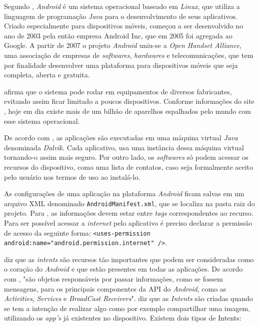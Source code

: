 
	\par Segundo , \textit{Android} é um sistema
operacional baseado em \textit{Linux}, que utiliza a
linguagem de programação \textit{Java} para o desenvolvimento de seus
aplicativos. Criado especialmente para dispositivos móveis, começou a
ser desenvolvido no ano de 2003 pela então empresa Android Inc, que em 2005 foi
agregada ao Google. A partir de 2007 o projeto \textit{Android} uniu-se a
\textit{Open Handset Alliance}, uma associação de empresas de
\textit{softwares}, \textit{hardwares} e telecomunicações, que tem por
finalidade desenvolver uma plataforma para dispositivos móveis que seja
completa, aberta e gratuita.

	\par {} afirma que o sistema pode rodar em equipamentos
de diversos fabricantes, evitando assim ficar limitado a poucos dispositivos.
Conforme informações do site , hoje em dia existe mais de
um bilhão de aparelhos espalhados pelo mundo com esse sistema operacional.

	\par De acordo com , as aplicações são executadas em
uma máquina virtual \textit{Java} denominada \textit{Dalvik}. Cada aplicativo,
usa uma instância dessa máquina virtual tornando-o assim mais seguro. Por outro lado, os
\textit{softwares} só podem acessar os recursos do dispositivo, como uma
lista de contatos, caso seja formalmente aceito pelo usuário nos termos de uso
ao instalá-lo.

	\par As configurações de uma aplicação na plataforma \textit{Android} ficam
salvas em um arquivo XML denominado \texttt{AndroidManifest.xml}, que se
localiza na pasta raiz do projeto. Para , as informações devem estar
entre \textit{tags} correspondentes ao recurso. Para ser possível acessar a
\textit{internet} pelo aplicativo é preciso declarar a permissão de acesso da
seguinte forma: \texttt{<uses-permission
android:name="android.permission.internet" />}.

	\par {} diz que as \textit{intents} são recursos tão
importantes que podem ser consideradas como o coração do \textit{Android} e que
estão presentes em todas as aplicações.	De acordo com
, "são objetos responsáveis por passar informações,
como se fossem mensagens, para os principais componentes da API do
\textit{Android}, como as \textit{Activities}, \textit{Services} e
\textit{BroadCast Receivers}".  diz que as
\textit{Intents} são criadas quando se tem a intenção de realizar algo como por
exemplo compartilhar uma imagem, utilizando os \textit{app's} já existentes no
dispositivo. Existem dois tipos de Intents:
	

